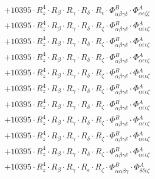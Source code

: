 \documentclass{article}
\begin{document}
\begin{subequations}
\begin{gather}
\begin{array}{c}
 \\[0.2em] 		 + 10395 \cdot R_{z}^{4} \cdot R_{\beta{}} \cdot R_{\gamma{}} \cdot R_{\delta{}} \cdot R_{\epsilon{}} \cdot \Phi{}^{B}_{\alpha{}\beta{}\gamma{}\delta{}} \cdot \Phi{}^{A}_{\alpha{}\epsilon{}\zeta{}\zeta{}} 
 \\[0.2em] 		 + 10395 \cdot R_{z}^{4} \cdot R_{\beta{}} \cdot R_{\gamma{}} \cdot R_{\delta{}} \cdot R_{\zeta{}} \cdot \Phi{}^{B}_{\alpha{}\beta{}\gamma{}\delta{}} \cdot \Phi{}^{A}_{\alpha{}\epsilon{}\epsilon{}\zeta{}} 
 \\[0.2em] 		 + 10395 \cdot R_{z}^{4} \cdot R_{\beta{}} \cdot R_{\gamma{}} \cdot R_{\delta{}} \cdot R_{\zeta{}} \cdot \Phi{}^{B}_{\alpha{}\beta{}\gamma{}\delta{}} \cdot \Phi{}^{A}_{\alpha{}\epsilon{}\epsilon{}\zeta{}} 
 \\[0.2em] 		 + 10395 \cdot R_{z}^{4} \cdot R_{\beta{}} \cdot R_{\gamma{}} \cdot R_{\delta{}} \cdot R_{\zeta{}} \cdot \Phi{}^{B}_{\alpha{}\beta{}\gamma{}\delta{}} \cdot \Phi{}^{A}_{\alpha{}\epsilon{}\epsilon{}\zeta{}} 
 \\[0.2em] 		 + 10395 \cdot R_{z}^{4} \cdot R_{\beta{}} \cdot R_{\gamma{}} \cdot R_{\delta{}} \cdot R_{\zeta{}} \cdot \Phi{}^{B}_{\alpha{}\beta{}\gamma{}\delta{}} \cdot \Phi{}^{A}_{\alpha{}\epsilon{}\epsilon{}\zeta{}} 
 \\[0.2em] 		 + 10395 \cdot R_{z}^{4} \cdot R_{\beta{}} \cdot R_{\gamma{}} \cdot R_{\delta{}} \cdot R_{\zeta{}} \cdot \Phi{}^{B}_{\alpha{}\beta{}\gamma{}\delta{}} \cdot \Phi{}^{A}_{\alpha{}\epsilon{}\epsilon{}\zeta{}} 
 \\[0.2em] 		 + 10395 \cdot R_{z}^{4} \cdot R_{\beta{}} \cdot R_{\gamma{}} \cdot R_{\delta{}} \cdot R_{\zeta{}} \cdot \Phi{}^{B}_{\alpha{}\beta{}\gamma{}\delta{}} \cdot \Phi{}^{A}_{\alpha{}\epsilon{}\epsilon{}\zeta{}} 
 \\[0.2em] 		 + 10395 \cdot R_{z}^{4} \cdot R_{\beta{}} \cdot R_{\gamma{}} \cdot R_{\delta{}} \cdot R_{\zeta{}} \cdot \Phi{}^{B}_{\alpha{}\beta{}\gamma{}\delta{}} \cdot \Phi{}^{A}_{\alpha{}\epsilon{}\epsilon{}\zeta{}} 
 \\[0.2em] 		 + 10395 \cdot R_{z}^{4} \cdot R_{\beta{}} \cdot R_{\gamma{}} \cdot R_{\delta{}} \cdot R_{\zeta{}} \cdot \Phi{}^{B}_{\alpha{}\beta{}\gamma{}\delta{}} \cdot \Phi{}^{A}_{\alpha{}\epsilon{}\epsilon{}\zeta{}} 
 \\[0.2em] 		 + 10395 \cdot R_{z}^{4} \cdot R_{\beta{}} \cdot R_{\gamma{}} \cdot R_{\delta{}} \cdot R_{\zeta{}} \cdot \Phi{}^{B}_{\alpha{}\beta{}\gamma{}\delta{}} \cdot \Phi{}^{A}_{\alpha{}\epsilon{}\epsilon{}\zeta{}} 
 \\[0.2em] 		 + 10395 \cdot R_{z}^{4} \cdot R_{\beta{}} \cdot R_{\gamma{}} \cdot R_{\epsilon{}} \cdot R_{\zeta{}} \cdot \Phi{}^{B}_{\alpha{}\alpha{}\beta{}\gamma{}} \cdot \Phi{}^{A}_{\delta{}\delta{}\epsilon{}\zeta{}} 

\end{array}
\end{gather}
\end{subequations}
\end{document}
